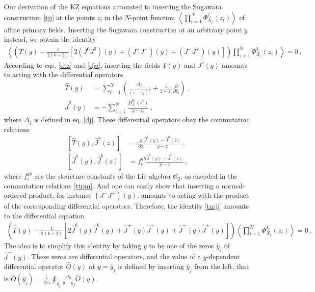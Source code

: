 \documentclass[12pt, a4paper, notitlepage, twoside]{report}
\numberwithin{equation}{section}
\theoremstyle{break}
\begin{document}
Our derivation of the KZ equations amounted to inserting the Sugawara construction \eqref{tjj}  at the points $z_i$ in the $N$-point function $\left\langle \prod_{i=1}^N \Phi^{j_i}_{X_i}(z_i)\right\rangle $ of affine primary fields.
Inserting the Sugawara construction at an arbitrary point $y$ instead, we obtain the identity
\begin{align}
 \left\langle \left(T(y)  - \frac{1}{2(k+2)}\left[ 2(J^0J^0)(y)+(J^+J^-)(y)+(J^-J^+)(y)\right]\right) \prod_{i=1}^N \Phi^{j_i}_{X_i}(z_i)\right\rangle = 0\ .
\label{tmjj}
\end{align}
According to eqs. \eqref{dtz} and \eqref{dja}, inserting the fields $T(y)$ and $J^a(y)$ amounts to acting with the differential operators 
\begin{align}
 \hat{T}(y) &= \sum_{i=1}^N \left(\frac{\Delta_{j_i}}{(z-z_i)^2} + \frac{1}{z-z_i}{\frac{\partial}{\partial z_i}}\right)\ ,
\label{tcy}
\\
 \hat{J}^a(y) &= - \sum_{i=1}^N \frac{D^{R_i}_{X_i}(t^a)}{y-z_i}\ ,
\label{jay}
\end{align}
where $\Delta_j$ is defined in eq. \eqref{dj}.
These differential operators obey the commutation relations
\begin{align}
 \left[\hat{T}(y),\hat{J}^a(z)\right] &= {\frac{\partial}{\partial z}} \frac{\hat{J}^a(y)-\hat{J}^a(z)}{y-z}\ ,
\label{dtd}
\\
 \left[ \hat{J}^a(y),\hat{J}^b(z)\right] &= f^{ab}_c \frac{\hat{J}^c(y)-\hat{J}^c(z)}{y-z}\ ,
\label{ddd}
\end{align}
where $f^{ab}_c$ are the structure constants of the Lie algebra $\mathfrak{sl}_2$, as encoded in the commutation relations \eqref{ttpm}.
And one can easily show that inserting a normal-ordered product, for instance $(J^-J^+)(y)$, amounts to acting with the product of the corresponding differential operators.
Therefore, the identity \eqref{tmjj} amounts to the differential equation
\begin{align}
 \left(\hat{T}(y) -\frac{1}{2(k+2)}\left[ 2\hat{J}^0(y)\hat{J}^0(y) +\hat{J}^+(y)\hat{J}^-(y)+\hat{J}^-(y)\hat{J}^+(y)\right]\right) \left\langle \prod_{i=1}^N \Phi^{j_i}_{X_i}(z_i)\right\rangle=0\ .
\end{align}
The idea is to simplify this identity by taking $y$ to be one of the zeros $\hat{y}_j$ of $ \hat{J}^-(y)$.
These zeros are differential operators, and the value of a $y$-dependent differential operator $\hat{O}(y)$ at $y=\hat{y}_j$ is defined by inserting $\hat{y}_j$ from the left, that is $ \hat{O}(\hat{y}_j) = \frac{1}{2\pi i}\oint_{\hat{y}_j} \frac{dy}{y-\hat{y}_j} \hat{O}(y) $.
\end{document}
